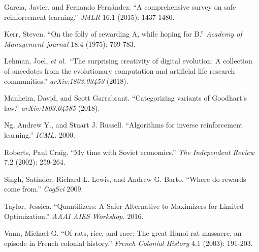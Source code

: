 \documentclass[11pt]{article}
\newcommand{\etal}{{\em et al.}\ }
\begin{document}
\begin{description}
\end{description}



\begin{thebibliography}{99}
Garcıa, Javier, and Fernando Fernández. ``A comprehensive survey on safe
reinforcement learning.'' \textit{JMLR} 16.1 (2015): 1437-1480.

Kerr, Steven. ``On the folly of rewarding A, while hoping for B.''
\textit{Academy of Management journal} 18.4 (1975): 769-783.

Lehman, Joel, \etal ``The surprising creativity of digital evolution: A
collection of anecdotes from the evolutionary computation and artificial life
research communities.'' \textit{arXiv:1803.03453} (2018).

Manheim, David, and Scott Garrabrant. ``Categorizing variants of Goodhart's
law.'' \textit{arXiv:1803.04585} (2018).

Ng, Andrew Y., and Stuart J. Russell. ``Algorithms for inverse reinforcement
learning.'' \textit{ICML.} 2000.

Roberts, Paul Craig. ``My time with Soviet economics.'' \textit{The Independent
Review} 7.2 (2002): 259-264.

Singh, Satinder, Richard L. Lewis, and Andrew G. Barto. ``Where do rewards come
from.'' \textit{CogSci} 2009.

Taylor, Jessica. ``Quantilizers: A Safer Alternative to Maximizers for Limited
Optimization.'' \textit{AAAI AIES Workshop.} 2016.

Vann, Michael G. ``Of rats, rice, and race: The great Hanoi rat massacre, an
episode in French colonial history.'' \textit{French Colonial History} 4.1
(2003): 191-203.
\end{thebibliography}
\end{document}
